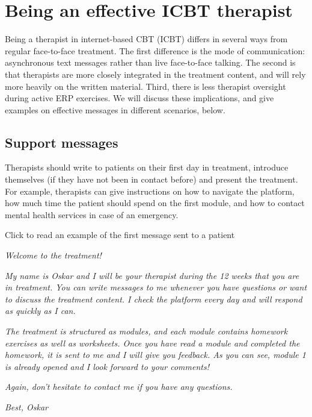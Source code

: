 \documentclass[]{book}
\begin{document}
\hypertarget{being-an-effective-icbt-therapist}{%
\chapter{Being an effective ICBT therapist}\label{being-an-effective-icbt-therapist}}

Being a therapist in internet-based CBT (ICBT) differs in several ways from regular face-to-face treatment. The first difference is the mode of communication: asynchronous text messages rather than live face-to-face talking. The second is that therapists are more closely integrated in the treatment content, and will rely more heavily on the written material. Third, there is less therapist oversight during active ERP exercises. We will discuss these implications, and give examples on effective messages in different scenarios, below.

\hypertarget{support-messages}{%
\section{Support messages}\label{support-messages}}

Therapists should write to patients on their first day in treatment, introduce themselves (if they have not been in contact before) and present the treatment. For example, therapists can give instructions on how to navigate the platform, how much time the patient should spend on the first module, and how to contact mental health services in case of an emergency.

Click to read an example of the first message sent to a patient

\emph{Welcome to the treatment!}

\emph{My name is Oskar and I will be your therapist during the 12 weeks that you are in treatment. You can write messages to me whenever you have questions or want to discuss the treatment content. I check the platform every day and will respond as quickly as I can.}

\emph{The treatment is structured as modules, and each module contains homework exercises as well as worksheets. Once you have read a module and completed the homework, it is sent to me and I will give you feedback. As you can see, module 1 is already opened and I look forward to your comments!}

\emph{Again, don't hesitate to contact me if you have any questions.}

\emph{Best, Oskar}
\end{document}
